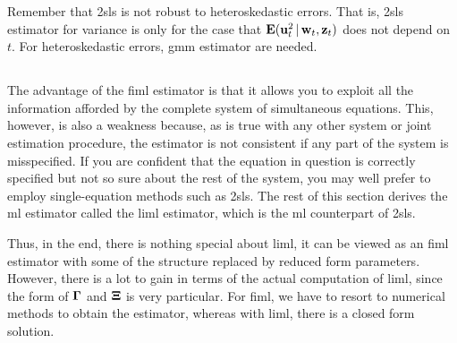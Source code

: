 \documentclass[a4paper]{article}
\begin{document}

\begin{remark}
	Remember that \gls*{2sls} is not robust to heteroskedastic errors.
	That is, \gls*{2sls} estimator for variance is only for the case that $\operatorname{\text{\textrm{\upshape\textbf{E}}}}(\mathbf{u}_t^2\,|\, \mathbf{w}_t,\mathbf{z}_t)$ does not depend on $t$.
	For heteroskedastic errors, \gls*{gmm} estimator are needed.
\end{remark}

\subsection{}

\begin{remark}
	The advantage of the \gls*{fiml} estimator is that
	it allows you to exploit all the information afforded by the complete system of simultaneous equations.
	This, however, is also a weakness because, as is true with any other system or joint estimation procedure,
	the estimator is not consistent if any part of the system is misspecified.
	If you are confident that the equation in question is correctly specified but not so sure about the rest of the system,
	you may well prefer to employ single-equation methods such as \gls*{2sls}.
	The rest of this section derives the \gls*{ml} estimator called the \gls*{liml} estimator,
	which is the \gls*{ml} counterpart of \gls*{2sls}.
\end{remark}

\begin{remark}
	Thus, in the end, there is nothing special about \gls*{liml},
	it can be viewed as an \gls*{fiml} estimator with some of the structure replaced by reduced form parameters.
	However, there is a lot to gain in terms of the actual computation of \gls*{liml},
	since the form of $\boldsymbol{\Gamma}$ and $\boldsymbol{\Xi}$ is very particular.
	For \gls*{fiml}, we have to resort to numerical methods to obtain the estimator,
	whereas with \gls*{liml}, there is a closed form solution.
\end{remark}
\end{document}
